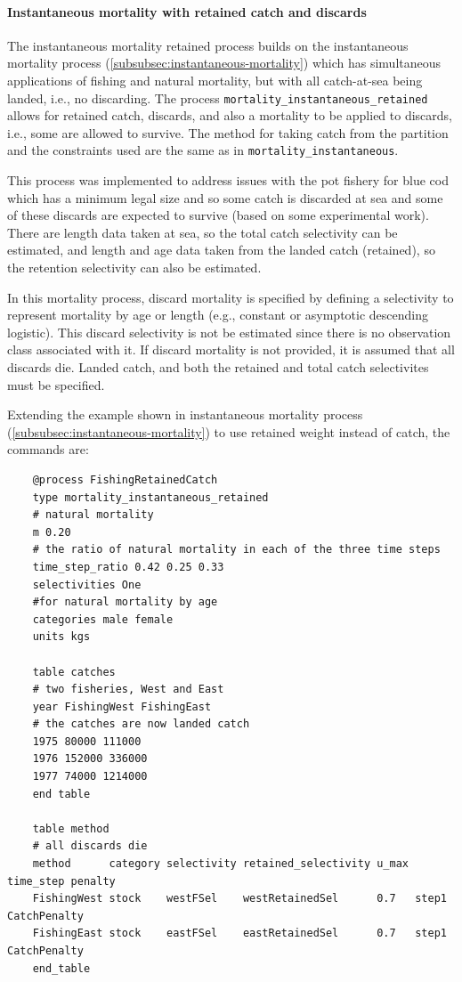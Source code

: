 \paragraph{Instantaneous mortality with retained catch and discards}\label{sec:inst-mort-retained}

The instantaneous mortality retained process builds on the instantaneous mortality process (\ref{subsubsec:instantaneous-mortality}) which has simultaneous applications of fishing and natural
mortality, but with all catch-at-sea being landed, i.e., no discarding. The process \texttt{mortality\_instantaneous\_retained} allows for retained catch, discards, and also a mortality to be applied to discards, i.e., some are allowed to survive. The method for taking catch from the partition and the constraints used are the same as in \texttt{mortality\_instantaneous}.

This process was implemented to address issues with the pot fishery for blue cod which has a minimum legal size and so some catch is discarded at sea and some of these discards are expected to survive (based on some experimental work). There are length data taken at sea, so the total catch selectivity can be estimated, and length and age data taken from the landed catch (retained), so the retention selectivity can also be estimated.

In this mortality process, discard mortality is specified by defining a selectivity to represent mortality by age or length (e.g., constant or asymptotic descending logistic).  This discard selectivity is not be estimated since there is no observation class associated with it. If discard mortality is not provided, it is assumed that all discards die. Landed catch, and both the retained and total catch selectivites must be specified.

Extending the example shown in instantaneous mortality process (\ref{subsubsec:instantaneous-mortality}) to use retained weight instead of catch, the commands are:

{\small{\begin{verbatim}
    @process FishingRetainedCatch
    type mortality_instantaneous_retained
    # natural mortality
    m 0.20
    # the ratio of natural mortality in each of the three time steps
    time_step_ratio 0.42 0.25 0.33
    selectivities One
    #for natural mortality by age
    categories male female
    units kgs

    table catches
    # two fisheries, West and East
    year FishingWest FishingEast
    # the catches are now landed catch
    1975 80000 111000
    1976 152000 336000
    1977 74000 1214000
    end table

    table method
    # all discards die
    method      category selectivity retained_selectivity u_max time_step penalty
    FishingWest stock    westFSel    westRetainedSel      0.7   step1     CatchPenalty
    FishingEast stock    eastFSel    eastRetainedSel      0.7   step1     CatchPenalty
    end_table
    \end{verbatim}}}

